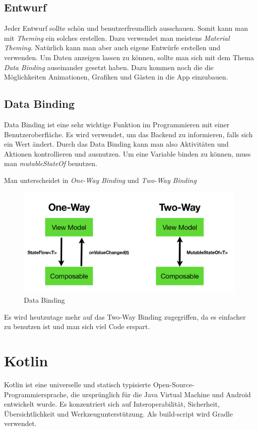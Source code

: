\subsection{Entwurf}
\author{Bozidar Spasenovic}
Jeder Entwurf sollte schön und benutzerfreundlich ausschauen. Somit kann man mit \textit{Theming} ein solches erstellen.
Dazu verwendet man meistens \textit{Material Theming}. Natürlich kann man aber auch eigene Entwürfe erstellen und verwenden.
Um Daten anzeigen lassen zu können, sollte man sich mit dem Thema \textit{Data Binding} auseinander gesetzt haben.
Dazu kommen noch die die Möglichkeiten Animationen, Grafiken und Gästen in die App einzubauen.


\subsection{Data Binding}
\author{Bozidar Spasenovic}
Data Binding ist eine sehr wichtige Funktion im Programmieren mit einer Benutzeroberfläche. Es wird verwendet, um das Backend 
zu informieren, falls sich ein Wert ändert. Durch das Data Binding kann man also Aktivitäten und Aktionen kontrollieren und ausnutzen.
Um eine Variable binden zu können, muss man \textit{mutableStateOf} benutzen. 

Man unterscheidet in \textit{One-Way Binding} und \textit{Two-Way Binding}  

\begin{figure}[htp]
    \author{Bozidar Spasenovic}
    \centering
    \includegraphics[scale=0.50]{pics/Data-Binding.PNG}
    \caption{Data Binding}
    \label{fig:impl:Data Binding}
\end{figure}   

Es wird heutzutage mehr auf das Two-Way Binding zugegriffen, da es einfacher zu benutzen ist und man sich viel Code erspart.



\pagebreak
\section{Kotlin}
\cite{Kotlin1}
\cite{Kotlin2}
\author{Bozidar Spasenovic}
Kotlin ist eine universelle und statisch typisierte Open-Source-Programmiersprache, die ursprünglich für die Java Virtual Machine und Android entwickelt wurde.
Es konzentriert sich auf Interoperabilität, Sicherheit, Übersichtlichkeit und Werkzeugunterstützung. Als build-script wird Gradle verwendet.

